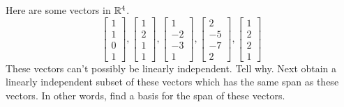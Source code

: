\documentclass{ximera}
\begin{document}
\begin{problem}\label{prb:3.27} Here are some vectors in $\mathbb{R}^{4}$.
\begin{equation*}
\left[
\begin{array}{r}
1 \\
1 \\
0 \\
1
\end{array}
\right] ,\left[
\begin{array}{r}
1 \\
2 \\
1 \\
1
\end{array}
\right] ,\left[
\begin{array}{r}
1 \\
-2 \\
-3 \\
1
\end{array}
\right] ,\left[
\begin{array}{r}
2 \\
-5 \\
-7 \\
2
\end{array}
\right] ,\left[
\begin{array}{r}
1 \\
2 \\
2 \\
1
\end{array}
\right]
\end{equation*}
These vectors can't possibly be linearly independent. Tell why. Next obtain a
linearly independent subset of these vectors which has the same span as
these vectors. In other words, find a basis for the span of these vectors.
\end{problem}
\end{document}
